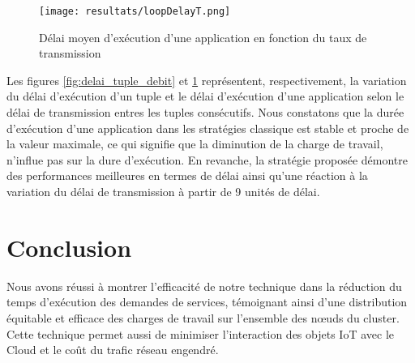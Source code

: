 \begin{figure}[H]
  \centering
  \texttt{[image: resultats/loopDelayT.png]}
  \caption{Délai moyen d'exécution d'une application en fonction du taux de transmission}
  \label{fig:delai_application_debit}
\end{figure}

Les figures \ref{fig:delai_tuple_debit} et \ref{fig:delai_application_debit} représentent, respectivement, la variation du délai d'exécution d'un tuple et le délai d'exécution d'une application selon le délai de transmission entres les tuples consécutifs.
Nous constatons que la durée d'exécution d'une application dans les stratégies classique est stable et proche de la valeur maximale, ce qui signifie que la diminution de la charge de travail, n'influe pas sur la dure d'exécution. En revanche, la stratégie proposée démontre des performances meilleures en termes de délai ainsi qu'une réaction à la variation du délai de transmission à partir de 9 unités de délai.\par

\section{Conclusion}
Nous avons réussi à montrer l'efficacité de notre technique dans la réduction du temps d'exécution des demandes de services, témoignant ainsi d'une distribution équitable et efficace des charges de travail sur l'ensemble des nœuds du cluster. Cette technique permet aussi de minimiser l'interaction des objets IoT avec le Cloud et le coût du trafic réseau engendré.